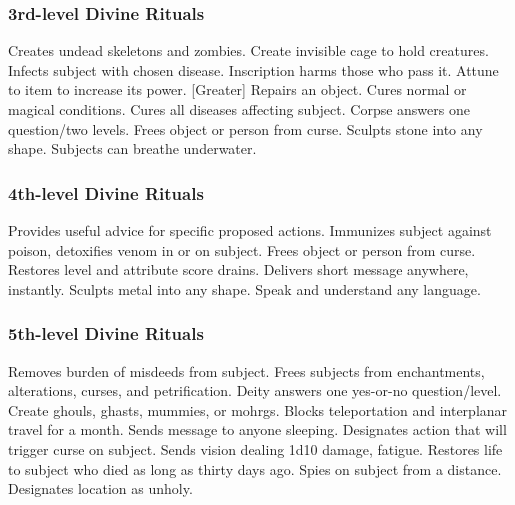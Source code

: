 \subsubsection{3rd-level Divine Rituals}
\begin{rituallist}
     Creates undead skeletons and zombies.
     Create invisible cage to hold creatures.
     Infects subject with chosen disease.
    \M Inscription harms those who pass it.
     Attune to item to increase its power.
    [Greater] Repairs an object.
     Cures normal or magical conditions.
     Cures all diseases affecting subject.
     Corpse answers one question/two levels.
     Frees object or person from curse.
     Sculpts stone into any shape.
     Subjects can breathe underwater.
\end{rituallist}

\subsubsection{4th-level Divine Rituals}
\begin{rituallist}
     Provides useful advice for specific proposed actions.
     Immunizes subject against poison, detoxifies venom in or on subject.
     Frees object or person from curse.
     Restores level and attribute score drains.
     Delivers short message anywhere, instantly.
     Sculpts metal into any shape.
     Speak and understand any language.
\end{rituallist}

\subsubsection{5th-level Divine Rituals}
\begin{rituallist}
    \F\M Removes burden of misdeeds from subject.
     Frees subjects from enchantments, alterations, curses, and petrification.
     Deity answers one yes-or-no question/level.
     Create ghouls, ghasts, mummies, or mohrgs.
     Blocks teleportation and interplanar travel for a month.
     Sends message to anyone sleeping.
     Designates action that will trigger curse on subject.
     Sends vision dealing 1d10 damage, fatigue.
     Restores life to subject who died as long as thirty days ago.
    \F Spies on subject from a distance.
     Designates location as unholy.
\end{rituallist}

